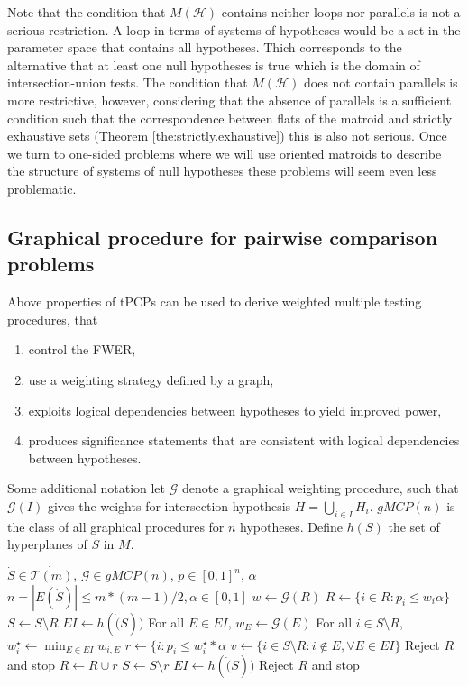 \documentclass[a4paper,12pt]{article}
\newcommand{\gmcp}{\mathcal{G}}
\begin{document}
Note that the condition that $M(\mathscr{H})$ contains neither loops
nor parallels is not a serious restriction. A loop in terms of systems
of hypotheses would be a set in the parameter space that contains all
hypotheses. Thich corresponds to the alternative that at least one
null hypotheses is true which is the domain of intersection-union
tests. The condition that $M(\mathscr{H})$ does not contain parallels
is more restrictive, however, considering that the absence of
parallels is a sufficient condition such that the correspondence
between flats of the matroid and strictly exhaustive sets (Theorem
\ref{the:strictly.exhaustive}) this is also not serious. Once we turn
to one-sided problems where we will use oriented matroids to describe
the structure of systems of null hypotheses these problems will seem
even less problematic.


\subsection{Graphical procedure for pairwise comparison problems}

Above properties of tPCPs can be used to derive weighted multiple
testing procedures, that
\begin{enumerate}
\item control the FWER,
\item use a weighting strategy defined by a graph,
\item exploits logical dependencies between hypotheses to yield
  improved power,
\item produces significance statements that are consistent with
  logical dependencies between hypotheses.
\end{enumerate}

Some additional notation let $\gmcp$ denote a graphical weighting
procedure, such that $\gmcp(I)$ gives the weights for intersection
hypothesis $H = \bigcup_{i \in I} H_i$. $gMCP(n)$ is the class of all
graphical procedures for $n$ hypotheses. Define $h(S)$ the set of
hyperplanes of $S$ in $M$. 

\begin{algorithmic}
  \REQUIRE $\dot{S} \in \dot{\mathcal{T}(m)}$, $\gmcp \in gMCP(n)$, 
  $p \in [0,1]^n$, $\alpha$
  \ENSURE $n = |E(\dot{S})| \leq m*(m-1)/2, \alpha \in [0,1]$
  \STATE $w \gets \gmcp(R)$
  \STATE $R \gets \{i \in R: p_i \leq w_i \alpha\}$
  \STATE $S \gets S \setminus R$
  \STATE $EI \gets h(\dot(S))$
  \STATE For all $E \in EI$, $w_E \gets \gmcp(E)$
  \STATE For all $i \in S\setminus R$, $w_i^\star \gets \min_{E \in
    EI}w_{i,E}$
  \STATE $r \gets \{i:p_i \leq w_i^\star*\alpha$
  \STATE $v \gets \{i \in S\setminus R:i \notin E, \forall E \in EI\}$
  \STATE Reject $R$ and stop
  \ENDIF
  \STATE $R \gets R \cup r$
  \STATE $S \gets S\setminus r$
  \STATE $EI \gets h(\dot(S))$
  \ENDWHILE
  \STATE Reject $R$ and stop
\end{algorithmic}
\end{document}
